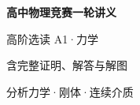 \documentclass[UTF8,zihao=-4,oneside,openany]{ctexbook}
\begin{document}
\frontmatter
\begin{titlepage}
  \centering
  \vspace*{0.25\textheight}
  {\Huge\bfseries 高中物理竞赛一轮讲义\par}
  \vspace{1.2em}
  {\Large 高阶选读 A1·力学\par}
  \vspace{0.8em}
  {\large 含完整证明、解答与解图\par}
  \vfill
  {\color{TextGray}分析力学·刚体·连续介质\par}
\end{titlepage}
\tableofcontents
\mainmatter

\end{document}
